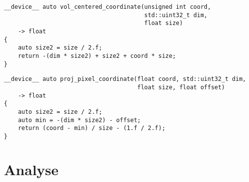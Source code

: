 \begin{code}
\begin{verbatim}
__device__ auto vol_centered_coordinate(unsigned int coord,
                                        std::uint32_t dim,
                                        float size)
    -> float
{
    auto size2 = size / 2.f;
    return -(dim * size2) + size2 + coord * size;
}
\end{verbatim}
\label{app:coord_vol}
\end{code}

\begin{code}
\begin{verbatim}
__device__ auto proj_pixel_coordinate(float coord, std::uint32_t dim,
                                      float size, float offset)
    -> float
{
    auto size2 = size / 2.f;
    auto min = -(dim * size2) - offset;
    return (coord - min) / size - (1.f / 2.f);
}
\end{verbatim}
\label{app:coord_det}
\end{code}

\chapter{Analyse}
